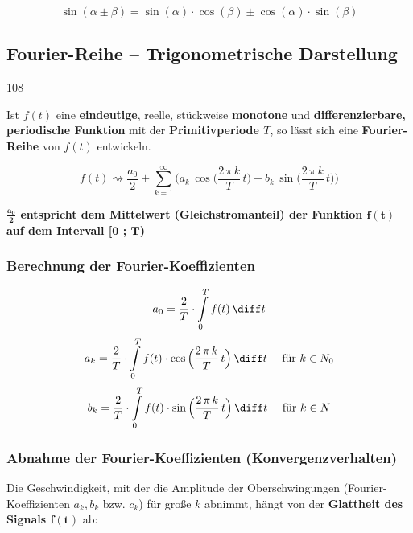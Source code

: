 \vspace{0.2cm}

$$ \sin(\alpha \pm \beta) = \sin(\alpha) \cdot \cos(\beta) \pm \cos(\alpha) \cdot \sin(\beta) $$
	

\subsection{Fourier-Reihe -- Trigonometrische Darstellung}{108}

Ist $f(t)$ eine \textbf{eindeutige}, reelle, stückweise \textbf{monotone} und \textbf{differenzierbare, periodische Funktion} mit der
\textbf{Primitivperiode $T$}, so lässt sich eine \textbf{Fourier-Reihe} von $f(t)$ entwickeln.

$$ \boxed{ f(t) \rightsquigarrow \frac{a_0}{2} + \sum\limits_{k=1}^\infty \Bigg( a_k\, \cos \Big(\frac{2 \, \pi \, k}{T} \, t \Big) + b_k\, \sin \Big(\frac{2 \, \pi \, k}{T} \, t \Big)  \Bigg) } $$

\textbf{$\bm{\frac{a_0}{2}}$ entspricht dem Mittelwert (Gleichstromanteil) der Funktion $\bm{f(t)}$ auf dem Intervall [$\bm{0}$ ; $\bm{T}$)} 


\subsubsection{Berechnung der Fourier-Koeffizienten}
\label{Berechnung der Fourier-Koeffizienten - Trigonometrisch}

$$ a_0 = \frac{2}{T} \cdot \int \limits_{0}^{T} f(t) \, \diff t $$
$$ a_k = \frac{2}{T} \cdot \int \limits_{0}^{T} f(t) \cdot \cos \Big( \frac{2 \, \pi \, k}{T} \, t \Big) \, \diff t \quad \text{ für } k \in N_0 $$
$$ b_k = \frac{2}{T} \cdot \int \limits_{0}^{T} f(t) \cdot \sin \Big( \frac{2 \, \pi \, k}{T} \, t \Big) \, \diff t \quad \text{ für } k \in N $$

\textbf{}

\subsubsection{Abnahme der Fourier-Koeffizienten (Konvergenzverhalten)}
Die Geschwindigkeit, mit der die Amplitude der Oberschwingungen (Fourier-Koeffizienten $a_k, b_k$ bzw. $c_k$) für große $k$ abnimmt, hängt von der \textbf{Glattheit des Signals $\bm{f(t)}$} ab:

